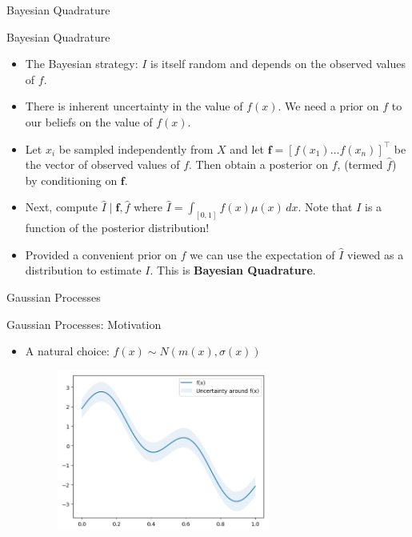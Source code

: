 \documentclass{beamer}
\begin{document}
\begin{section}{Bayesian Quadrature}

\begin{frame}{Bayesian Quadrature}
    \begin{itemize}
        \item The Bayesian strategy: $I$ is itself random and depends on the observed values of $f$.
        \pause
        \item There is inherent uncertainty in the value of $f(x)$. We need a prior on $f$ to our beliefs on the value of $f(x)$.  
        \pause
        \item Let $x_i$ be sampled independently from $X$ and let $\textbf{f} = [f(x_1) \ldots f(x_n)]^{\top}$ be the vector of observed values of $f$. Then obtain a posterior on $f$, (termed $\hat{f}$) by conditioning on $\textbf{f}$.
        \pause
        \item Next, compute $\hat{I} \mid \textbf{f}, \hat{f}$ where $\hat{I} = \int_{[0,1]}f(x)\mu(x)\,dx$. Note that $I$ is a function of the posterior distribution! 
        \pause
        \item Provided a convenient prior on $f$ we can use the expectation of $\hat{I}$ viewed as a distribution to estimate $I$. This is \textbf{Bayesian Quadrature}.
    \end{itemize}
\end{frame}

\begin{subsection}{Gaussian Processes}
\begin{frame}{Gaussian Processes: Motivation}
    \begin{itemize}
     \item A natural choice: $f(x) \sim N(m(x), \sigma(x))$
     \begin{figure}[h]
         \centering
         \includegraphics[width=0.66\textwidth]{output_24_0.png}
         \label{fig:GP}
     \end{figure}
    \end{itemize}
\end{frame}


\end{subsection}
\end{section}
\end{document}
